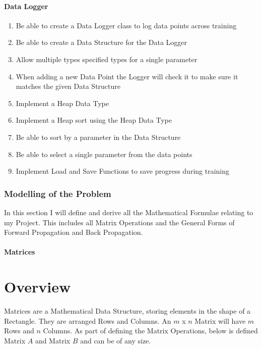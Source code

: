 \begin{flushleft}
            \subsubsection*{Data Logger}
                \begin{enumerate}
                    \item Be able to create a Data Logger class to log data points across training
                    \item Be able to create a Data Structure for the Data Logger
                    \item Allow multiple types specified types for a single parameter
                    \item When adding a new Data Point the Logger will check it to make sure it matches the given Data Structure
                    \item Implement a Heap Data Type
                    \item Implement a Heap sort using the Heap Data Type
                    \item Be able to sort by a parameter in the Data Structure
                    \item Be able to select a single parameter from the data points
                    \item Implement Load and Save Functions to save progress during training
                \end{enumerate}   

        \subsection{Modelling of the Problem}
            \large
            \vspace{0.2cm}
            In this section I will define and derive all the Mathematical Formulae relating to my Project. This includes all Matrix Operations 
            and the General Forms of Forward Propagation and Back Propagation. \\
            \vspace{0.2cm}

            \subsubsection{Matrices}
                \chapter{Overview}
                Matrices are a Mathematical Data Structure, storing elements in the shape of a Rectangle. They are arranged Rows and Columns.
                An $m$ x $n$ Matrix will have $m$ Rows and $n$ Columns.
                \vspace{0.2cm}
                As part of defining the Matrix Operations, below is defined Matrix $A$ and Matrix $B$ and can be of any size.
                \vspace{0.5cm}


\end{flushleft}
